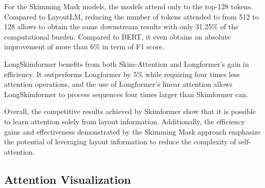 For the Skimming Mask models, the models attend only to the top-128 tokens. Compared to LayoutLM, reducing the number of tokens attended to from 512 to 128 allows to obtain the same downstream results with only 31.25\% of the computational burden. Compared to \ac{BERT}, it even obtains an absolute improvement of more than 6\% in term of F1 score.

LongSkimformer benefits from both Skim-Attention and Longformer's gain in efficiency. It outperforms Longformer by 5\% while requiring four times less attention operations, and the use of Longformer's linear attention allows LongSkimformer to process sequences four times larger than Skimformer can.

Overall, the competitive results achieved by Skimformer show that it is possible to learn attention solely from layout information. Additionally, the efficiency gains and effectiveness demonstrated by the Skimming Mask approach emphasize the potential of leveraging layout information to reduce the complexity of self-attention.



\subsection{Attention Visualization}
\label{subsection:attention-visualization}

